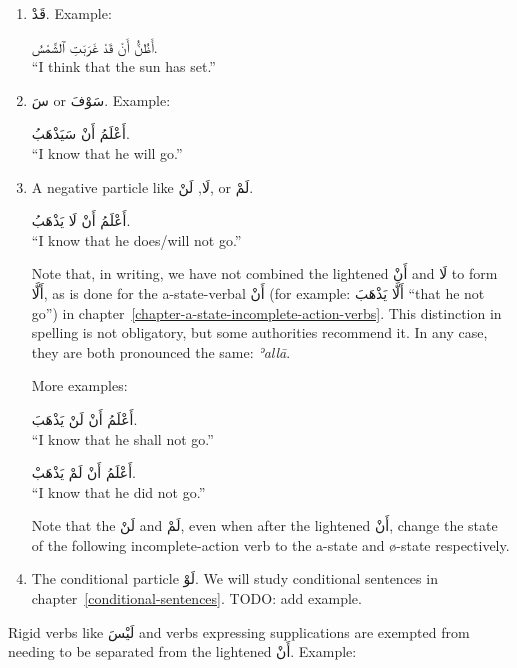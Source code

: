 \documentclass[
  10pt,
]{book}
\begin{document}
\begin{enumerate}
\def\labelenumi{\arabic{enumi}.}
\item
  \foreignlanguage{arabic}{قَدْ}. Example:

  \foreignlanguage{arabic}{أَظُنُّ أَنْ قَدْ غَرَبَتِ ٱلشَّمْسُ.}\\
  \enquote{I think that the sun has set.}
\item
  \foreignlanguage{arabic}{سَ} or \foreignlanguage{arabic}{سَوْفَ}. Example:

  \foreignlanguage{arabic}{أَعْلَمُ أَنْ سَيَذْهَبُ.}\\
  \enquote{I know that he will go.}
\item
  A negative particle like \foreignlanguage{arabic}{لَا}, \foreignlanguage{arabic}{لَنْ}, or \foreignlanguage{arabic}{لَمْ}.

  \foreignlanguage{arabic}{أَعْلَمُ أَنْ لَا يَذْهَبُ.}\\
  \enquote{I know that he does/will not go.}

  Note that, in writing, we have not combined the lightened \foreignlanguage{arabic}{أَنْ} and \foreignlanguage{arabic}{لَا} to form \foreignlanguage{arabic}{أَلَّا}, as is done for the a-state-verbal \foreignlanguage{arabic}{أَنْ} (for example: \foreignlanguage{arabic}{أَلَّا يَذْهَبَ} \enquote{that he not go}) in chapter~\ref{chapter-a-state-incomplete-action-verbs}. This distinction in spelling is not obligatory, but some authorities recommend it. In any case, they are both pronounced the same: \emph{ʾallā}.

  More examples:

  \foreignlanguage{arabic}{أَعْلَمُ أَنْ لَنْ يَذْهَبَ.}\\
  \enquote{I know that he shall not go.}

  \foreignlanguage{arabic}{أَعْلَمُ أَنْ لَمْ يَذْهَبْ.}\\
  \enquote{I know that he did not go.}

  Note that the \foreignlanguage{arabic}{لَنْ} and \foreignlanguage{arabic}{لَمْ}, even when after the lightened \foreignlanguage{arabic}{أَنْ}, change the state of the following incomplete-action verb to the a-state and ø-state respectively.
\item
  The conditional particle \foreignlanguage{arabic}{لَوْ}. We will study conditional sentences in chapter~\ref{conditional-sentences}. TODO: add example.
\end{enumerate}

Rigid verbs like \foreignlanguage{arabic}{لَيْسَ} and verbs expressing supplications are exempted from needing to be separated from the lightened \foreignlanguage{arabic}{أَنْ}. Example:
\end{document}
